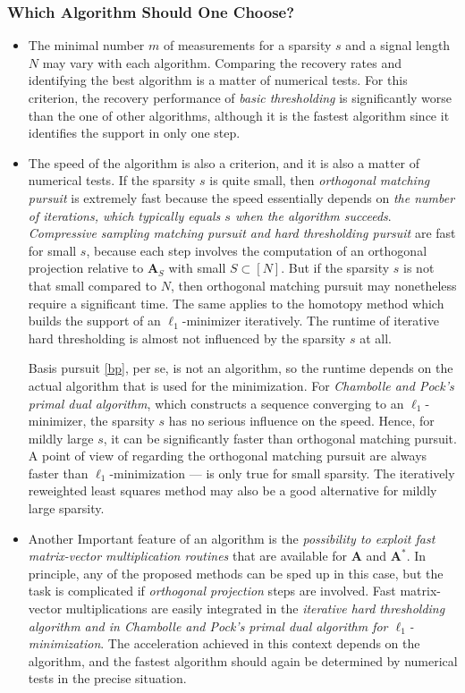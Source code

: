 \subsubsection{Which Algorithm Should One Choose?}
\begin{itemize}
    \item The minimal number $m$ of measurements for a sparsity $s$ and a signal length $N$ may vary with each algorithm. Comparing the recovery rates and identifying the best algorithm is a matter of numerical tests. 
        For this criterion, the recovery performance of \emph{basic thresholding} is significantly worse than the one of other algorithms, although it is the fastest algorithm since it identifies the support in only one step.
    \item The speed of the algorithm is also a criterion, and it is also a matter of numerical tests. If the sparsity $s$ is quite small, then \emph{orthogonal matching pursuit} is extremely fast because the speed essentially depends on \emph{the number of iterations, which typically equals $s$ when the algorithm succeeds}. \emph{Compressive sampling matching pursuit and hard thresholding pursuit} are fast for small $s$, because each step involves the computation of an orthogonal projection relative to $\mathbf{A}_S$ with small $S \subset [N]$. But if the sparsity $s$ is not that small compared to $N$, then orthogonal matching pursuit may nonetheless require a significant time. The same applies to the homotopy method which builds the support of an $\ell_1$-minimizer iteratively. The runtime of iterative hard thresholding is almost not influenced by the sparsity $s$ at all.

        Basis pursuit \cref{bp}, per se, is not an algorithm, so the runtime depends on the actual algorithm that is used for the minimization. For \emph{\textcolor[rgb]{1,0,0}{Chambolle and Pock's primal dual algorithm}}, which constructs a sequence converging to an $\ell_1$-minimizer, the sparsity $s$ has no serious influence on the speed. Hence, for \textcolor[rgb]{1,0,0}{mildly large $s$}, it can be significantly faster than orthogonal matching pursuit. A point of view of regarding the orthogonal matching pursuit are always faster than $\ell_1$-minimization --- is only true for small sparsity. \textcolor[rgb]{1,0,0}{The iteratively reweighted least squares method} may also be a good alternative for mildly large sparsity.

    \item Another Important feature of an algorithm is the \emph{\textcolor[rgb]{1,0,0}{possibility to exploit fast matrix-vector multiplication routines}} that are available for $\mathbf{A}$ and $\mathbf{A}^*$. In principle, any of the proposed methods can be sped up in this case, but the task is complicated if \emph{orthogonal projection} steps are involved. Fast matrix-vector multiplications are easily integrated in the \emph{iterative hard thresholding algorithm and in Chambolle and Pock's primal dual algorithm for $\ell_1$-minimization}. The acceleration achieved in this context depends on the algorithm, and the fastest algorithm should again be determined by numerical tests in the precise situation.
\end{itemize}

